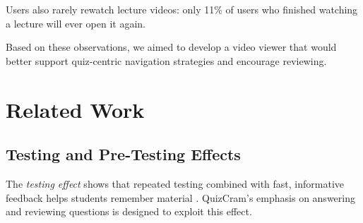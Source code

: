 \documentclass{sigchi}
\begin{document}
Users also rarely rewatch lecture videos: only 11\% of users who finished watching a lecture will ever open it again.

Based on these observations, we aimed to develop a video viewer that would better support quiz-centric navigation strategies and encourage reviewing.



\section{Related Work}

\subsection{Testing and Pre-Testing Effects}

The \emph{testing effect} shows that repeated testing combined with fast, informative feedback helps students remember material \cite{testingeffect}. QuizCram's emphasis on answering and reviewing questions is designed to exploit this effect.

\end{document}
